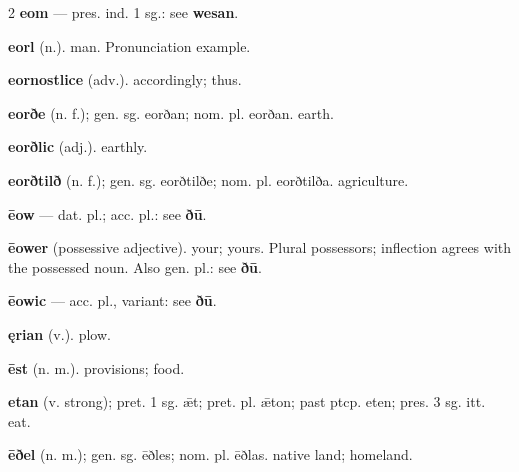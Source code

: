 \begin{multicols*}{2}
\textbf{eom} — pres. ind. 1 sg.: see \textbf{wesan}.\par
\textbf{eorl} (n.). man. Pronunciation example.\par
\textbf{eornostlice} (adv.). accordingly; thus.\par
\textbf{eorðe} (n. f.); gen. sg. eorðan; nom. pl. eorðan. earth.\par
\textbf{eorðlic} (adj.). earthly.\par
\textbf{eorðtilð} (n. f.); gen. sg. eorðtilðe; nom. pl. eorðtilða. agriculture.\par
\textbf{ēow} — dat. pl.; acc. pl.: see \textbf{ðū}.\par
\textbf{ēower} (possessive adjective). your; yours. Plural possessors; inflection agrees with the possessed noun. Also gen. pl.: see \textbf{ðū}.\par
\textbf{ēowic} — acc. pl., variant: see \textbf{ðū}.\par
\textbf{ęrian} (v.). plow.\par
\textbf{ēst} (n. m.). provisions; food.\par
\textbf{etan} (v. strong); pret. 1 sg. ǣt; pret. pl. ǣton; past ptcp. eten; pres. 3 sg. itt. eat.\par
\textbf{ēðel} (n. m.); gen. sg. ēðles; nom. pl. ēðlas. native land; homeland.\par

\end{multicols*}
